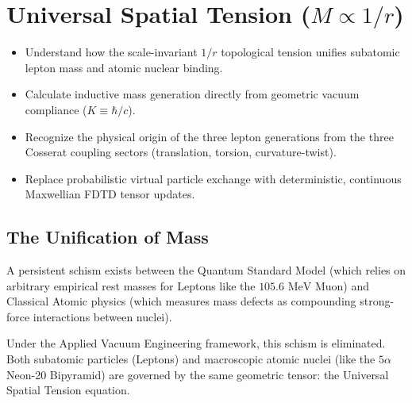 \chapter{Universal Spatial Tension ($M \propto 1/r$)}
\label{ch:universal_spatial_tension}

\begin{objectivebox}
\begin{itemize}
    \item Understand how the scale-invariant $1/r$ topological tension unifies subatomic lepton mass and atomic nuclear binding.
    \item Calculate inductive mass generation directly from geometric vacuum compliance ($K \equiv \hbar/c$).
    \item Recognize the physical origin of the three lepton generations from the three Cosserat coupling sectors (translation, torsion, curvature-twist).
    \item Replace probabilistic virtual particle exchange with deterministic, continuous Maxwellian FDTD tensor updates.
\end{itemize}
\end{objectivebox}

\section{The Unification of Mass}
A persistent schism exists between the Quantum Standard Model (which relies on arbitrary empirical rest masses for Leptons like the $105.6 \text{ MeV}$ Muon) and Classical Atomic physics (which measures mass defects as compounding strong-force interactions between nuclei). 

Under the Applied Vacuum Engineering framework, this schism is eliminated. Both subatomic particles (Leptons) and macroscopic atomic nuclei (like the $5\alpha$ Neon-20 Bipyramid) are governed by the same geometric tensor: the Universal Spatial Tension equation. 

